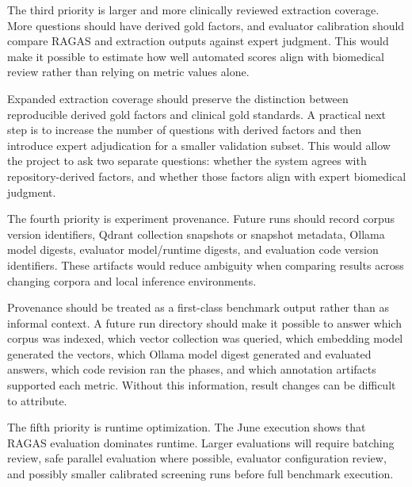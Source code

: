 The third priority is larger and more clinically reviewed extraction coverage. More questions should have derived gold factors, and evaluator calibration should compare RAGAS and extraction outputs against expert judgment. This would make it possible to estimate how well automated scores align with biomedical review rather than relying on metric values alone.

Expanded extraction coverage should preserve the distinction between reproducible derived gold factors and clinical gold standards. A practical next step is to increase the number of questions with derived factors and then introduce expert adjudication for a smaller validation subset. This would allow the project to ask two separate questions: whether the system agrees with repository-derived factors, and whether those factors align with expert biomedical judgment.

The fourth priority is experiment provenance. Future runs should record corpus version identifiers, Qdrant collection snapshots or snapshot metadata, Ollama model digests, evaluator model/runtime digests, and evaluation code version identifiers. These artifacts would reduce ambiguity when comparing results across changing corpora and local inference environments.

Provenance should be treated as a first-class benchmark output rather than as informal context. A future run directory should make it possible to answer which corpus was indexed, which vector collection was queried, which embedding model generated the vectors, which Ollama model digest generated and evaluated answers, which code revision ran the phases, and which annotation artifacts supported each metric. Without this information, result changes can be difficult to attribute.

The fifth priority is runtime optimization. The June execution shows that RAGAS evaluation dominates runtime. Larger evaluations will require batching review, safe parallel evaluation where possible, evaluator configuration review, and possibly smaller calibrated screening runs before full benchmark execution.

